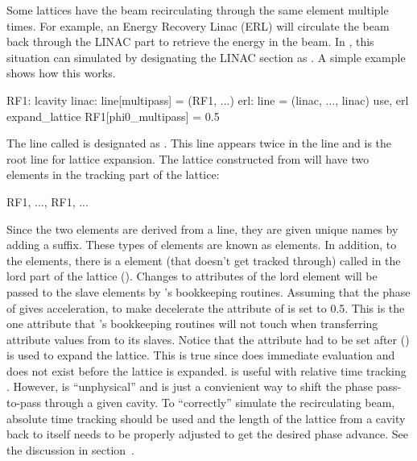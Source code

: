 Some lattices have the beam recirculating through the same element
multiple times. For example, an Energy Recovery Linac (ERL) will
circulate the beam back through the LINAC part to retrieve the energy
in the beam. In \bmad, this situation can simulated by designating the LINAC section
as . A simple example shows how this
works.
\begin{example}
  RF1: lcavity
  linac: line[multipass] = (RF1, ...)
  erl: line = (linac, ..., linac)
  use, erl
  expand_lattice
  RF1[phi0_multipass] = 0.5
\end{example}
The line called  is designated as . This
 line appears twice in the line  and  is the
root line for lattice expansion. The lattice constructed from 
will have two  elements in the tracking part of the lattice:
\begin{example}
  RF1, ..., RF1, ...
\end{example}
Since the two elements are derived from a  line, they are given unique names by adding
a  suffix. These types of elements are known as  elements. In
addition, to the  elements, there is a  element (that doesn't
get tracked through) called  in the lord part of the lattice ().  Changes
to attributes of the lord  element will be passed to the slave elements by \bmad's
bookkeeping routines. Assuming that the phase of  gives acceleration, to make 
decelerate the  attribute of  is set to 0.5. This is the one attribute
that \bmad's bookkeeping routines will not touch when transferring attribute values from  to
its slaves. Notice that the  attribute had to be set after 
() is used to expand the lattice. This is true since \bmad does immediate evaluation and
 does not exist before the lattice is expanded.  is useful with
relative time tracking . However,  is ``unphysical'' and is just
a convienient way to shift the phase pass-to-pass through a given cavity. To ``correctly'' simulate
the recirculating beam, absolute time tracking should be used and the length of the lattice from a
cavity back to itself needs to be properly adjusted to get the desired phase advance. See the discussion
in section~.

